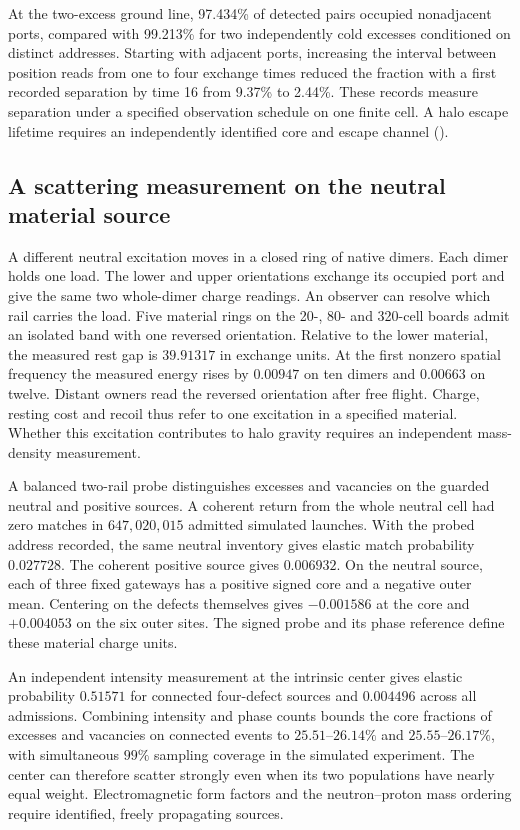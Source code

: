 \documentclass[11pt]{article}
\begin{document}
At the two-excess ground line, 97.434\% of detected pairs occupied
nonadjacent ports, compared with 99.213\% for two independently cold
excesses conditioned on distinct addresses. Starting with adjacent
ports, increasing the interval between position reads from one to four
exchange times reduced the fraction with a first recorded separation by
time 16 from 9.37\% to 2.44\%. These records measure separation under a
specified observation schedule on one finite cell. A halo escape
lifetime requires an independently identified core and escape channel
().

\subsection{A scattering measurement on the neutral material source}

A different neutral excitation moves in a closed ring of native dimers.
Each dimer holds one load. The lower and upper orientations exchange
its occupied port and give the same two whole-dimer charge readings.
An observer can resolve which rail carries the load. Five material
rings on the 20-, 80- and 320-cell boards admit an isolated band with
one reversed orientation. Relative to the lower material, the measured
rest gap is $39.91317$ in exchange units. At the first nonzero spatial
frequency the measured energy rises by $0.00947$ on ten dimers and
$0.00663$ on twelve. Distant owners read the reversed orientation
after free flight. Charge, resting cost and recoil thus refer to one
excitation in a specified material. Whether this excitation contributes
to halo gravity requires an independent mass-density measurement.

A balanced two-rail probe distinguishes excesses and vacancies on the
guarded neutral and positive sources. A coherent return from the whole
neutral cell had zero matches in $647{,}020{,}015$ admitted simulated
launches. With the probed address recorded, the same neutral inventory
gives elastic match probability $0.027728$. The coherent positive source
gives $0.006932$. On the neutral source, each of three fixed gateways
has a positive signed core and a negative outer mean. Centering on the
defects themselves gives $-0.001586$ at the core and $+0.004053$ on the
six outer sites. The signed probe and its phase reference define these
material charge units.

An independent intensity measurement at the intrinsic center gives
elastic probability $0.51571$ for connected four-defect sources and
$0.004496$ across all admissions. Combining intensity and phase counts
bounds the core fractions of excesses and vacancies on connected events
to $25.51$--$26.14\%$ and $25.55$--$26.17\%$, with simultaneous
$99\%$ sampling coverage in the simulated experiment. The center can
therefore scatter strongly even when its two populations have nearly
equal weight. Electromagnetic form factors and the neutron--proton mass
ordering require identified, freely propagating sources.
\end{document}
